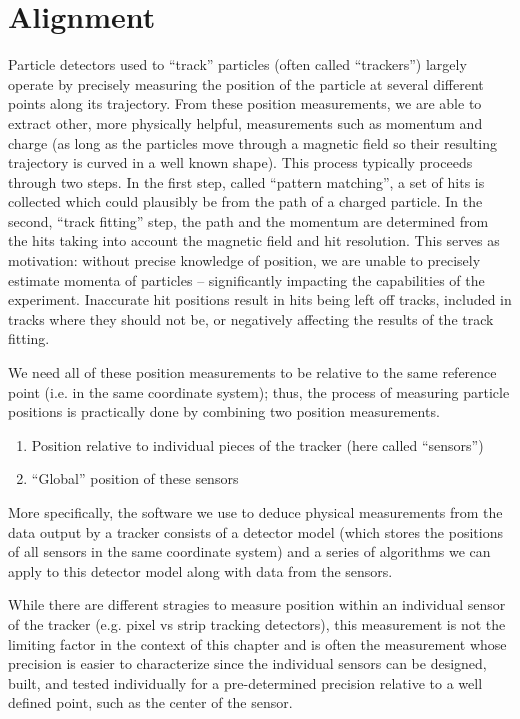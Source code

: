 \chapter{Alignment}
\label{chapter:hps:alignment}

Particle detectors used to ``track'' particles (often called ``trackers'') largely operate by
precisely measuring the position of the particle at several different points along its trajectory.
From these position measurements, we are able to extract other, more physically helpful,
measurements such as momentum and charge (as long as the particles move through a magnetic field so
their resulting trajectory is curved in a well known shape).
This process typically proceeds through two steps.
In the first step, called ``pattern matching'', a set of hits is collected which could plausibly
be from the path of a charged particle.
In the second, ``track fitting'' step, the path and the momentum are determined from the
hits taking into account the magnetic field and hit resolution.
This serves as motivation: without precise knowledge of position,
we are unable to precisely estimate momenta of particles -- significantly
impacting the capabilities of the experiment.
Inaccurate hit positions result in hits being left off tracks, included
in tracks where they should not be, or negatively affecting the results
of the track fitting.

We need all of these position measurements to be relative to the same reference point (i.e. in the
same coordinate system); thus, the process of measuring particle positions is practically done by
combining two position measurements.
\begin{enumerate}
  \item Position relative to individual pieces of the tracker (here called ``sensors'')
  \item ``Global'' position of these sensors
\end{enumerate}
More specifically, the software we use to deduce physical measurements from the data
output by a tracker consists of a detector model (which stores the positions of all
sensors in the same coordinate system) and a series of algorithms we can apply to
this detector model along with data from the sensors.

While there are different stragies to measure position within an individual sensor of the tracker
(e.g. pixel vs strip tracking detectors), this measurement is not the limiting factor in the
context of this chapter and is often the measurement whose precision is easier to characterize
since the individual sensors can be designed, built, and tested individually for a pre-determined
precision relative to a well defined point, such as the center of the sensor.

